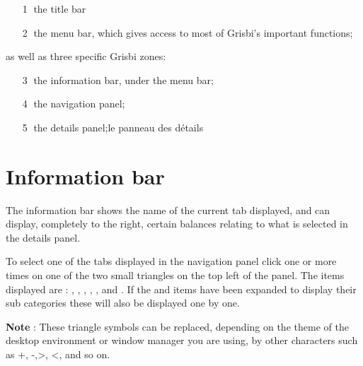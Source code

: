 \begin{itemize}%
	\item[\large\textcircled{\small 1}] the title bar%
	\item[\large\textcircled{\small 2}] the menu bar, which gives access to most of Grisbi's important functions;%
\end{itemize}
as well as three specific Grisbi zones:%
\begin{itemize}%
	\item[\large\textcircled{\small 3}] the information bar, under the menu bar;%
	\item[\large\textcircled{\small 4}] the navigation panel;%
	\item[\large\textcircled{\small 5}] the details panel;le panneau des détails
\end{itemize}


\section{Information bar\label{home-synthesis}}

The information bar shows the name of the current tab displayed, and can display, completely to the right, certain balances relating to what is selected in the details panel.%



To select one of the tabs displayed in the navigation panel click one or more times on one of the two small triangles on the top left of the panel.  The items displayed are : , , , , ,  and .  If the  and  items have been expanded to display their sub categories these will also be displayed one by one.

\textbf{Note} : These triangle symbols can be replaced, depending on the theme of the desktop environment or window manager you are using, by other characters such as +, -,>, <, and so on.

